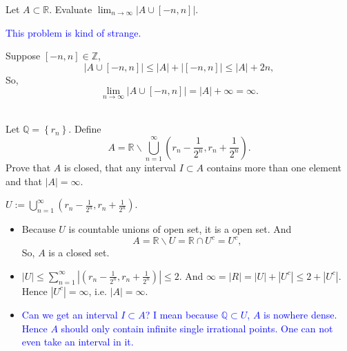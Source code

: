 \documentclass[en, normal, 11pt, black]{elegantnote}
\newenvironment{exercise}[1]{\begin{tcolorbox}[colback=black!15, colframe=black!80, breakable, title=#1]}{\end{tcolorbox}}
\renewenvironment{proof}{\begin{tcolorbox}[colback=white, colframe=black!50, breakable, title=Proof. ]\setlength{\parskip}{0.8em}}{\,\\\rightline{$\square$}\end{tcolorbox}}
\begin{document}
\begin{exercise}{(6), }
    Let $A \subset \mathbb{R}$. Evaluate $\lim _{n \rightarrow \infty}|A \cup[-n, n]|$. 
\end{exercise}
\begin{proof}
    \textcolor{blue}{This problem is kind of strange. }

    Suppose $[-n,n]\in\mathbb{Z}$, 
    \[|A\cup[-n,n]|\leqslant|A|+|[-n,n]|\leqslant|A|+2n, \]
    So, 
    \[\lim _{n \rightarrow \infty}|A \cup[-n, n]|=|A|+\infty=\infty. \]
    \vspace{-30pt}
\end{proof}

\begin{exercise}{(7), }
    Let $\mathbb{Q}=\left\{r_{n}\right\}$. Define
    \[
        A=\mathbb{R} \backslash \bigcup_{n=1}^{\infty}\left(r_{n}-\frac{1}{2^{n}}, r_{n}+\frac{1}{2^{n}}\right). 
    \]
    Prove that $A$ is closed, that any interval $I \subset A$ contains more than one element and that $|A|=\infty$. 
\end{exercise}
\begin{proof}
    $U:=\bigcup_{n=1}^{\infty}\left(r_{n}-\frac{1}{2^{n}}, r_{n}+\frac{1}{2^{n}}\right)$. 
    \begin{itemize}
        \item Because $U$ is countable unions of open set, it is a open set. And 
        \[
            A=\mathbb{R}\backslash U=\mathbb{R}\cap U^c=U^c, 
        \]  
        So, $A$ is a closed set. 
        \item $|U|\leqslant\sum_{n=1}^{\infty}|\left(r_{n}-\frac{1}{2^{n}}, r_{n}+\frac{1}{2^{n}}\right)|\leqslant2$. And $\infty=|R|=|U|+|U^c|\leqslant2+|U^c|$. Hence $|U^c|=\infty$, i.e. $|A|=\infty$. 
        \item \textcolor{blue}{Can we get an interval $I\subset A$? I mean because $\mathbb{Q}\subset U$, $A$ is nowhere dense. Hence $A$ should only contain infinite single irrational points. One can not even take an interval in it. }
    \end{itemize}
    \vspace{-30pt}
\end{proof}
\end{document}
